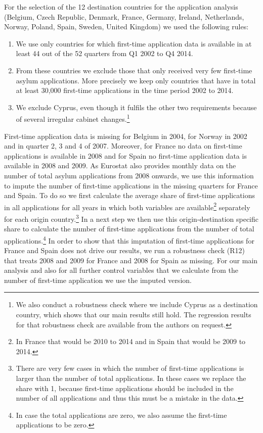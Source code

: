\documentclass[11pt,a4paper]{scrartcl}
\begin{document}
For the selection of the 12 destination countries for the application analysis (Belgium, Czech Republic, Denmark, France, Germany, Ireland, Netherlands, Norway, Poland, Spain, Sweden, United Kingdom) we used the following rules:
\begin{enumerate}
	\itemsep-0.2em
	\item We use only countries for which first-time application data is available in at least 44 out of the 52 quarters from Q1 2002 to Q4 2014.
	\item From these countries we exclude those that only received very few first-time asylum applications. More precisely we keep only countries that have in total at least 30,000 first-time applications in the time period 2002 to 2014.
	\item We exclude Cyprus, even though it fulfils the other two requirements because of several irregular cabinet changes.\footnote{We also conduct a robustness check where we include Cyprus as a destination country, which shows that our main results still hold. The regression results for that robustness check are available from the authors on request.}
\end{enumerate}   

First-time application data is missing for Belgium in 2004, for Norway in 2002 and in quarter 2, 3 and 4 of 2007. Moreover, for France no data on first-time applications is available in 2008 and for Spain no first-time application data is available in 2008 and 2009. As Eurostat also provides monthly data on the number of total asylum applications from 2008 onwards, we use this information to impute the number of first-time applications in the missing quarters for France and Spain. To do so we first calculate the average share of first-time applications in all applications for all years in which both variables are available\footnote{In France that would be 2010 to 2014 and in Spain that would be 2009 to 2014.} separately for each origin country.\footnote{There are very few cases in which the number of first-time applications is larger than the number of total applications. In these cases we replace the share with 1, because first-time applications should be included in the number of all applications and thus this must be a mistake in the data.} In a next step we then use this origin-destination specific share to calculate the number of first-time applications from the number of total applications.\footnote{In case the total applications are zero, we also assume the first-time applications to be zero.} In order to show that this imputation of first-time applications for France and Spain does not drive our results, we run a robustness check (R12) that treats 2008 and 2009 for France and 2008 for Spain as missing. For our main analysis and also for all further control variables that we calculate from the number of first-time application we use the imputed version.
\end{document}
